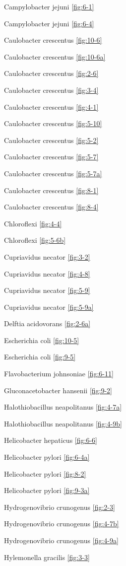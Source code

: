 \documentclass[]{tufte-book}
\begin{document}
Campylobacter jejuni \ref{fig:6-1}

Campylobacter jejuni \ref{fig:6-4}

Caulobacter crescentus \ref{fig:10-6}

Caulobacter crescentus \ref{fig:10-6a}

Caulobacter crescentus \ref{fig:2-6}

Caulobacter crescentus \ref{fig:3-4}

Caulobacter crescentus \ref{fig:4-1}

Caulobacter crescentus \ref{fig:5-10}

Caulobacter crescentus \ref{fig:5-2}

Caulobacter crescentus \ref{fig:5-7}

Caulobacter crescentus \ref{fig:5-7a}

Caulobacter crescentus \ref{fig:8-1}

Caulobacter crescentus \ref{fig:8-4}

Chloroflexi \ref{fig:4-4}

Chloroflexi \ref{fig:5-6b}

Cupriavidus necator \ref{fig:3-2}

Cupriavidus necator \ref{fig:4-8}

Cupriavidus necator \ref{fig:5-9}

Cupriavidus necator \ref{fig:5-9a}

Delftia acidovorans \ref{fig:2-6a}

Escherichia coli \ref{fig:10-5}

Escherichia coli \ref{fig:9-5}

Flavobacterium johnsoniae \ref{fig:6-11}

Gluconacetobacter hansenii \ref{fig:9-2}

Halothiobacillus neapolitanus \ref{fig:4-7a}

Halothiobacillus neapolitanus \ref{fig:4-9b}

Helicobacter hepaticus \ref{fig:6-6}

Helicobacter pylori \ref{fig:6-4a}

Helicobacter pylori \ref{fig:8-2}

Helicobacter pylori \ref{fig:9-3a}

Hydrogenovibrio crunogenus \ref{fig:2-3}

Hydrogenovibrio crunogenus \ref{fig:4-7b}

Hydrogenovibrio crunogenus \ref{fig:4-9a}

Hylemonella gracilis \ref{fig:3-3}
\end{document}
